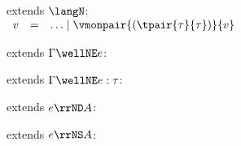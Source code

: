 \begin{flushleft}

 extends $\langN$:\\
$\begin{array}{l c l}
  v & = & \ldots \mid \vmonpair{(\tpair{\tau}{\tau})}{v}
\end{array}$

\medskip
\begin{minipage}[t]{0.5\textwidth}
 extends $\Gamma \wellNE e$:
\begin{mathpar}
\end{mathpar}
\end{minipage}%
\begin{minipage}[t]{0.5\textwidth}
 extends $\Gamma \wellNE e : \tau$:
\begin{mathpar}
\end{mathpar}
\end{minipage}

\medskip
\begin{minipage}[t]{0.5\textwidth}
 extends $e \rrND A$:
\begin{mathpar}

\end{mathpar}
\end{minipage}%
\begin{minipage}[t]{0.5\textwidth}
 extends $e \rrNS A$:
\begin{mathpar}

\end{mathpar}
\end{minipage}

\medskip
{}
\begin{mathpar}


\end{mathpar}
\end{flushleft}
